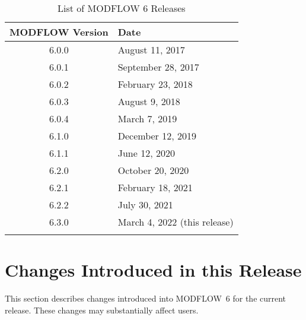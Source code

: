 \documentclass[11pt,twoside,twocolumn]{usgsreport}
\begin{document}
\begin{table}[h]
\begin{center}
\caption{List of MODFLOW 6 Releases}
\small 
\begin{tabular*}{12cm}{cl}
\hline
\hline
\textbf{MODFLOW Version} & \textbf{Date}\\
\hline
6.0.0 & August 11, 2017 \\
6.0.1 & September 28, 2017 \\
6.0.2 & February 23, 2018 \\
6.0.3 & August 9, 2018 \\
6.0.4 & March 7, 2019 \\
6.1.0 & December 12, 2019 \\
6.1.1 & June 12, 2020 \\
6.2.0 & October 20, 2020 \\
6.2.1 & February 18, 2021 \\
6.2.2 & July 30, 2021 \\
6.3.0 & March 4, 2022 (this release) \\
\hline
\label{tab:releases}
\end{tabular*}
\end{center}
\normalsize
\end{table}


\section{Changes Introduced in this Release}
This section describes changes introduced into MODFLOW~6 for the current release.  These changes may substantially affect users.
\end{document}

